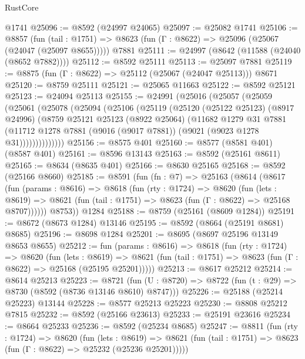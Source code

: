 \begin{lexlean}{RustCore}
\begin{coremodule}
    @1741
@25096 := @8592 (@24997 @24065)
@25097 := @25082 @1741
@25106 := @8857
    (fun (tail : @1751) => @8623 (fun (Γ : @8622) => @25096 (@25067 (@24047 (@25097 @8655)))))
    @7881
@25111 := @24997 (@8642 (@11588 (@24040 (@8652 @7882))))
@25112 := @8592 @25111
@25113 := @25097 @7881
@25119 := @8875 (fun (Γ : @8622) => @25112 (@25067 (@24047 @25113))) @8671
@25120 := @8759 @25111
@25121 := @25065 @11663
@25122 := @8592 @25121
@25123 := @24094 @25113
@25155 := @24991
    (@25016
      (@25057
        (@25059
          (@25061
            (@25078
              (@25094
                (@25106
                  (@25119
                    (@25120
                      (@25122 @25123)
                      (@8917 @24996)
                      (@8759
                        @25121
                        @25123
                        (@8922 @25064)
                        (@11682
                          @1279
                          @31
                          @7881
                          (@11712
                            @1278
                            @7881
                            (@9016 (@9017 @7881))
                            (@9021 (@9023 @1278 @31))))))))))))))
@25156 := @8575 @401
@25160 := @8577 (@8581 @401) (@8587 @401)
@25161 := @8596 @13143
@25163 := @8592 (@25161 @8611)
@25165 := @8634 (@8635 @401)
@25166 := @8630 @25165
@25168 := @8592 (@25166 @8660)
@25185 := @8591
    (fun (fn : @7) =>
    @25163
      (@8614
        (@8617
          (fun (params : @8616) =>
          @8618
            (fun (rty : @1724) =>
            @8620
              (fun (lets : @8619) =>
              @8621 (fun (tail : @1751) => @8623 (fun (Γ : @8622) => @25168 @8707))))))
        @8753))
    @1284
@25188 := @8759 (@25161 (@8609 @1284))
@25191 := @8672 (@8673 @1284) @13146
@25195 := @8592 (@8664 (@25191 @8681) @8685)
@25196 := @8698 @1284
@25201 := @8695 (@8697 @25196 @13149 @8653 @8655)
@25212 := fun (params : @8616) =>
  @8618
    (fun (rty : @1724) =>
    @8620
      (fun (lets : @8619) =>
      @8621 (fun (tail : @1751) => @8623 (fun (Γ : @8622) => @25168 (@25195 @25201)))))
@25213 := @8617 @25212
@25214 := @8614 @25213
@25223 := @8721
    (fun (U : @8720) => @8722 (fun (t : @29) => @8730 (@8592 (@8736 @13146 @8610) @8747)))
@25226 := @25188 (@25214 @25223) @13144
@25228 := @8577 @25213 @25223
@25230 := @8808 @25212 @7815
@25232 := @8592 (@25166 @23613)
@25233 := @25191 @23616
@25234 := @8664 @25233
@25236 := @8592 (@25234 @8685)
@25247 := @8811
    (fun (rty : @1724) =>
    @8620
      (fun (lets : @8619) =>
      @8621 (fun (tail : @1751) => @8623 (fun (Γ : @8622) => @25232 (@25236 @25201)))))

\end{coremodule}
\end{lexlean}
